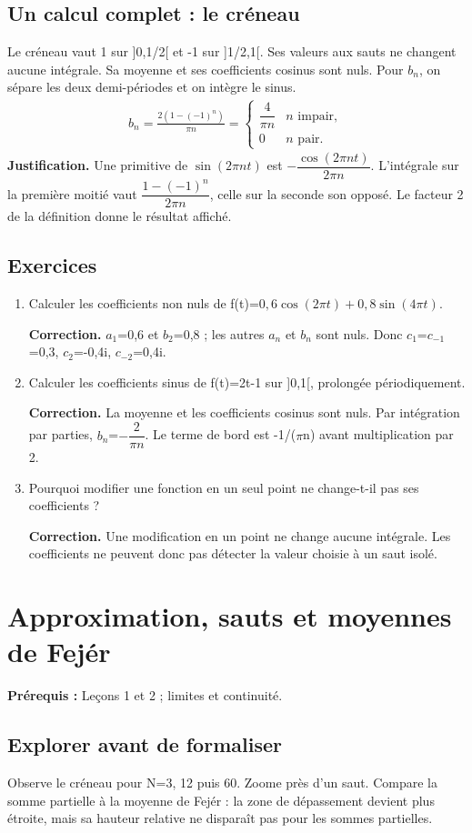 \documentclass[11pt,a4paper]{article}
\begin{document}
\subsection{Un calcul complet : le créneau}
Le créneau vaut 1 sur ]0,1/2[ et -1 sur ]1/2,1[. Ses valeurs aux sauts ne changent aucune intégrale. Sa moyenne et ses coefficients cosinus sont nuls. Pour $b_n$, on sépare les deux demi-périodes et on intègre le sinus.
\[\begin{gathered}b_n=\frac{2(1-(-1)^n)}{\pi n}=\begin{cases}\dfrac{4}{\pi n}&n\text{ impair},\\0&n\text{ pair}.\end{cases}\end{gathered}\]
\textbf{Justification.} Une primitive de $\sin(2\pi nt)$ est $-\dfrac{\cos(2\pi nt)}{2\pi n}$. L’intégrale sur la première moitié vaut $\dfrac{1-(-1)^n}{2\pi n}$, celle sur la seconde son opposé. Le facteur 2 de la définition donne le résultat affiché.
\subsection*{Exercices}\begin{enumerate}
\item Calculer les coefficients non nuls de f(t)=$0{,}6\cos(2\pi t)+0{,}8\sin(4\pi t)$.
\par\textbf{Correction.} $a_1$=0,6 et $b_2$=0,8 ; les autres $a_n$ et $b_n$ sont nuls. Donc $c_1$=$c_{-1}$=0,3, $c_2$=-0,4i, $c_{-2}$=0,4i.
\item Calculer les coefficients sinus de f(t)=2t-1 sur ]0,1[, prolongée périodiquement.
\par\textbf{Correction.} La moyenne et les coefficients cosinus sont nuls. Par intégration par parties, $b_n$=$-\dfrac2{\pi n}$. Le terme de bord est -1/($\pi$n) avant multiplication par 2.
\item Pourquoi modifier une fonction en un seul point ne change-t-il pas ses coefficients ?
\par\textbf{Correction.} Une modification en un point ne change aucune intégrale. Les coefficients ne peuvent donc pas détecter la valeur choisie à un saut isolé.
\end{enumerate}
\clearpage
\section{Approximation, sauts et moyennes de Fejér}
\textbf{Prérequis :} Leçons 1 et 2 ; limites et continuité.
\subsection*{Explorer avant de formaliser}Observe le créneau pour N=3, 12 puis 60. Zoome près d’un saut. Compare la somme partielle à la moyenne de Fejér : la zone de dépassement devient plus étroite, mais sa hauteur relative ne disparaît pas pour les sommes partielles.
\end{document}
